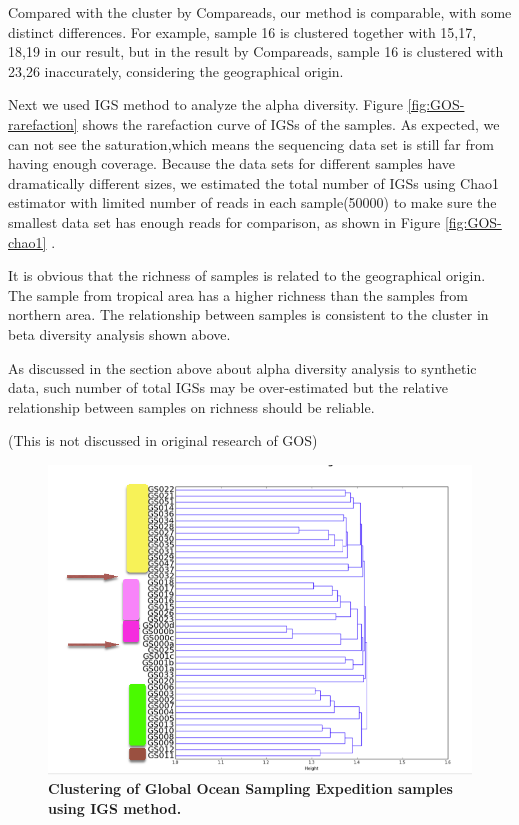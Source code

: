 Compared with the cluster by Compareads, our method is comparable, with some 
distinct differences. For example, sample 16 is clustered together with 15,17,
18,19 in our result, but in the result by Compareads, sample 16 is clustered 
with 23,26 inaccurately, considering the geographical origin.

Next we used IGS method to analyze the alpha diversity.
Figure \ref{fig:GOS-rarefaction} shows the rarefaction curve of IGSs of the samples.
As expected, we can not see the saturation,which means the sequencing data 
set is still far from having enough coverage. 
Because the data sets for different samples have dramatically different sizes, 
we estimated the total number of IGSs using Chao1 estimator with limited 
number of reads in each sample(50000) to make sure the smallest data set 
has enough reads for comparison, as shown in Figure \ref{fig:GOS-chao1} .

It is obvious that the richness of samples is related to the geographical 
origin. The sample from tropical area has a higher richness than
the samples from northern area. The relationship between samples is 
consistent to the cluster in beta diversity analysis shown above.

As discussed in the section above about alpha diversity analysis 
to synthetic data, such number of total IGSs may be over-estimated but
the relative relationship between samples on richness should be reliable.

(This is not discussed in original research of GOS)

\begin{figure}[!ht]
 \centerline{\includegraphics[width=7in]{./figures/GOS_cluster.png}}
\caption{\bf Clustering of Global Ocean Sampling Expedition samples using IGS
method.}
\label{fig:GOS-beta}
\end{figure}

